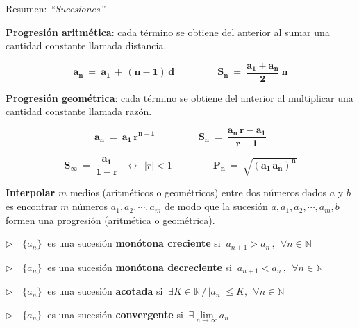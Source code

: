 \begin{myblock}{Resumen: \emph{``Sucesiones''}}

\vspace{2mm}\textbf{Progresión aritmética}: cada término se obtiene del anterior al sumar una cantidad constante llamada distancia.

$$\boxed{ \ \boldsymbol{a_n\ = \ a_1\, + \, (n-1)\, d}  \ } 
\qquad \qquad
 \boxed{\ \boldsymbol{ S_n\ = \ \dfrac{a_1+a_n}{2}\ n } \ }$$
 
\vspace{5mm} \textbf{Progresión geométrica}: cada término se obtiene del anterior al multiplicar una cantidad constante llamada razón.

$$\boxed{\ \boldsymbol{ a_n\ = \ a_1\, r^{n-1} } \ }
\qquad \qquad	
\boxed{\ \boldsymbol{ S_n\ = \ \dfrac{a_n\, r - a_1}{r-1} } \ }$$

$$\boxed{\ \boldsymbol{ S_\infty \ = \ \dfrac{a_1}{1-r}  } \ } \ \ \leftrightarrow \ \ |r|<1
\qquad \qquad	
\boxed{\ \boldsymbol{ P_n\ = \ \sqrt{(a_1\, a_n)^n} } \ }$$

\vspace{5mm} \textbf{Interpolar} $m$ medios (aritméticos o geométricos) entre dos números dados $a$ y $b$ es encontrar $m$ números $a_1,a_2,\cdots , a_m$ de modo que la sucesión $a,a_1,a_2,\cdots , a_m,b$ formen una progresión (aritmética o geométrica).

\vspace{5mm}$\triangleright \quad   \{a_n\} \ $ es una sucesión \textbf{monótona creciente } si $\ a_{n+1}>a_n\, , \ \ \forall n\in \mathbb N$


\vspace{2mm}$\triangleright \quad \{a_n\} \ $ es una sucesión \textbf{monótona decreciente } si $\ a_{n+1}<a_n\, , \ \ \forall n\in \mathbb N$

\vspace{5mm}$\triangleright \quad \{a_n\} \ $ es una sucesión\textbf{ acotada } si $\ \exists K \in \mathbb R \, / \,  |a_n|\leq K , \ \ \forall n\in \mathbb N$

\vspace{5mm}$\triangleright \quad \{a_n\} \ $ es una sucesión\textbf{ convergente  } si $\ \exists \ \underset{n\to \infty}{\mathrm{lim}}\, a_n$

\vspace{2mm}

\end{myblock}

















